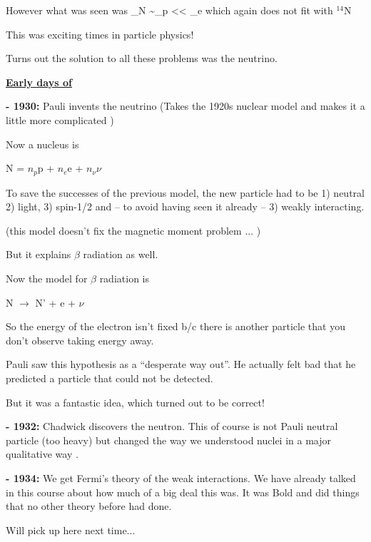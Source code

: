 {However what was seen was 
\be
\mu_N \sim \mu_p << \mu_e \hspace{0.2in} \textrm{which again does not fit with $^{14}$N}
\ee

This was exciting times in particle physics! 

Turns out the solution to all these problems was the neutrino.

\textbf{\underline{Early days of \nus}}

\textbf{- 1930:} Pauli invents the neutrino (Takes the 1920s nuclear model and makes it a little more complicated )

Now a nucleus is

\begin{center}
N = $n_p$p + $n_e$e + $n_\nu \nu$
\end{center}

To save the successes of the previous model, the new particle had to be 1) neutral 2) light, 3) spin-1/2 and -- to avoid having seen it already -- 3) weakly interacting. 

(this model doesn't fix the magnetic moment problem ... )

But it explains $\beta$ radiation as well.

Now the model for $\beta$ radiation is

\begin{center}
N $\rightarrow$ N' + e + $\nu$
\end{center}

So the energy of the electron isn't fixed b/c there is another particle that you don't observe taking energy away.

Pauli saw this hypothesis as a ``desperate way out''.
He actually felt bad that he predicted a particle that could not be detected. 

But it was a fantastic idea, which turned out to be correct! 


\textbf{- 1932:} Chadwick  discovers the neutron. This of course is not Pauli neutral particle (too heavy) but changed the way we understood nuclei in a major qualitative way . 

\textbf{- 1934:} We get Fermi's theory of the weak interactions.  We have already talked in this course about how much of a big deal this was. 
It was Bold and did things that no other theory before had done. 

Will pick up here next time...





}



